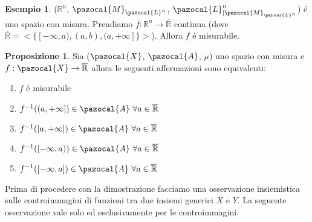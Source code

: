 \documentclass[11pt,a4paper]{report}
\theoremstyle{plain}
\theoremstyle{definition}
\newtheorem{exmp}[thm]{Esempio} %
\newtheorem{prop}[thm]{Proposizione} %
\newcommand{\X}{\pazocal{X}}
\newcommand{\Le}{\pazocal{L}}
\newcommand{\Ml}{\pazocal{M}_{\Le^n}}
\newcommand{\A}{\pazocal{A}}
\begin{document}
\begin{exmp}
	($\mathbb{R}^n$, $\Ml$, $\Le^n_{|\Ml}$) \'e uno spazio con misura. Prendiamo $f : \mathbb{R}^n \rightarrow \overline{\mathbb{R}}$ continua (dove $\overline{\mathbb{R}} = <\{[-\infty, a), (a,b), (a,+\infty]\}>$). Allora $f$ \'e misurabile.
\end{exmp}

\begin{prop}
	Sia ($\X$, $\A$, $\mu$) uno spazio con misura e $f : \X \rightarrow \overline{\mathbb{R}}$ allora le seguenti affermazioni sono equivalenti:
	\begin{enumerate}
		\item $f$ \'e misurabile
		\item $f^{-1}((a,+\infty]) \in \A\ \forall a \in \overline{\mathbb{R}}$
		\item $f^{-1}([a,+\infty]) \in \A\ \forall a \in \overline{\mathbb{R}}$
		\item $f^{-1}([-\infty, a)) \in \A\ \forall a \in \overline{\mathbb{R}}$
		\item $f^{-1}([-\infty, a]) \in \A\ \forall a \in \overline{\mathbb{R}}$
	\end{enumerate}
\end{prop}

Prima di procedere con la dimostrazione facciamo una osservazione insiemistica sulle controimmagini di funzioni tra due insiemi generici $X$ e $Y$.
La seguente osservazione vale solo ed esclusivamente per le controimmagini.
\end{document}
